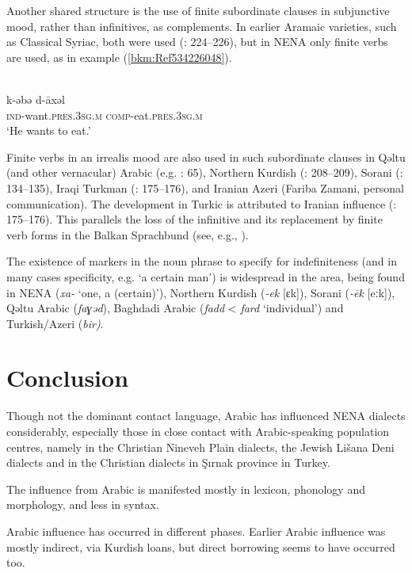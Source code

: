 \documentclass[output=paper]{langsci/langscibook}
\begin{document}
Another shared structure is the use of finite subordinate clauses in subjunctive mood, rather than infinitives, as complements. In earlier Aramaic varieties, such as Classical Syriac, both were used (\citealt{Nöldeke1904}: 224–226), but in NENA only finite verbs are used, as in example (\ref{bkm:Ref534226048}).

\ea\label{ex:coghill:}
\\
\gll k-əbə       d-āxəl\\
    \textsc{ind-}\textup{want.}\textsc{pres}.\textsc{3sg.m} \textsc{comp}\textup{{}-eat.}\textsc{pres}.\textsc{3sg.m}\\
\glt ‘He wants to eat.’\z

Finite verbs in an irrealis mood are also used in such subordinate clauses in Qəltu (and other vernacular) Arabic (e.g. \citealt{Jastrow1990}: 65), Northern Kurdish (\citealt{MacKenzie1961}: 208–209), Sorani (\citealt{MacKenzie1961}: 134–135), Iraqi Turkman (\citealt{Bulut2007}: 175–176), and Iranian Azeri (Fariba Zamani, personal communication). The development in Turkic is attributed to Iranian influence (\citealt{Bulut2007}: 175–176). This parallels the loss of the infinitive and its replacement by finite verb forms in the Balkan Sprachbund (see, e.g., \citealt{Joseph2009}).

The existence of markers in the noun phrase to specify for indefiniteness (and in many cases specificity, e.g. ‘a certain man’) is widespread in the area, being found in NENA (\textit{xa-} ‘one, a (certain)’), Northern Kurdish (\textit{\nobreakdash-ek} [ɛk]), Sorani (\textit{\nobreakdash-ēk} [eːk]), Qəltu Arabic (\textit{faɣəd}), Baghdadi Arabic (\textit{fadd} < \textit{fard} ‘individual’) and Turkish/Azeri (\textit{bir)}.


\section{Conclusion}

Though not the dominant contact language, Arabic has influenced NENA dialects considerably, especially those in close contact with Arabic-speaking population centres, namely in the Christian Nineveh Plain dialects, the Jewish Lišana Deni dialects and in the Christian dialects in Şırnak province in Turkey.

The influence from Arabic is manifested mostly in lexicon, phonology and morphology, and less in syntax.

Arabic influence has occurred in different phases. Earlier Arabic influence was mostly indirect, via Kurdish loans, but direct borrowing seems to have occurred too.
\end{document}
